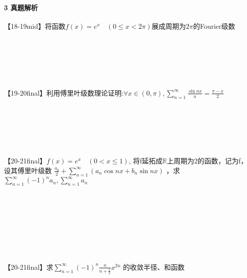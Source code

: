 \documentclass[12pt]{scrartcl}
\begin{document}
{\paragraph*{\large 3 真题解析}\leavevmode \newline
【18-19mid】将函数$f(x)=e^x\quad (0\leq x< 2\pi)$展成周期为$2\pi$的Fourier级数 \leavevmode \newline
\\
\\
\\
\\
\\
\\
\\
【19-20final】利用傅里叶级数理论证明:$\forall x\in (0,\pi),
\sum_{n = 1}^{\infty} \frac{\sin nx}{n}=\frac{\pi-x}{2}    $\leavevmode \newline
\\
\\
\\
\\
\\
\\
\\
【20-21final】$f(x)=e^x\quad (0<x\leq 1)$,
将f延拓成$\mathbb{R} $上周期为2的函数，记为f，设其傅里叶级数
$ \frac{a_0}{2}+\sum_{n = 1}^{\infty} (a_n \cos nx+b_n\sin nx)  $
，求$\sum_{n = 1}^{\infty} (-1)^na_n ,\sum_{n = 1}^{\infty} a_n$\leavevmode \newline
\\
\\
\\
\\
\\
\\
\\
\\
\\
【20-21final】求$\sum_{n = 1}^{\infty}(-1)^n\frac{n}{n+\frac{1}{2} }x^{2n} $
的收敛半径、和函数\leavevmode \newline  
\\
\\
\\
\\
\\
\\
\\
\\
\\
}
\end{document}

